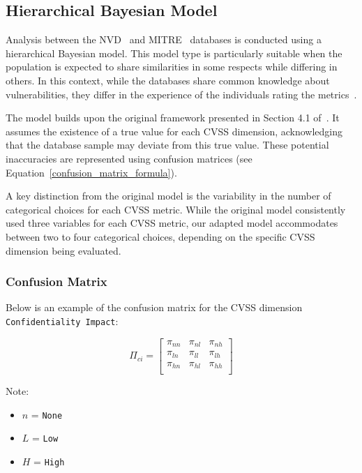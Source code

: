 \documentclass[12pt]{article}
\begin{document}
\subsection{Hierarchical Bayesian Model} \label{bayesian_modeling}

Analysis between the NVD~\cite{NVD} and MITRE~\cite{MITRE} databases is conducted using a
hierarchical Bayesian model. This model type is particularly suitable when the population is
expected to share similarities in some respects while differing in others. In this context, while
the databases share common knowledge about vulnerabilities, they differ in the experience of the
individuals rating the metrics~\cite{bayes}.

The model builds upon the original framework presented in Section 4.1 of~\cite{bayes}. It assumes
the existence of a true value for each CVSS dimension, acknowledging that the database sample may
deviate from this true value. These potential inaccuracies are represented using confusion matrices
(see Equation~\ref{confusion_matrix_formula}).

A key distinction from the original model is the variability in the number of categorical choices
for each CVSS metric. While the original model consistently used three variables for each CVSS
metric, our adapted model accommodates between two to four categorical choices, depending on the
specific CVSS dimension being evaluated.

\subsubsection{Confusion Matrix}

Below is an example of the confusion matrix for the CVSS dimension \texttt{Confidentiality Impact}:

\begin{equation}\label{confusion_matrix_formula}
	\Pi_{ci} = \begin{bmatrix}
		\pi_{nn} & \pi_{nl} & \pi_{nh} \\
		\pi_{ln} & \pi_{ll} & \pi_{lh} \\
		\pi_{hn} & \pi_{hl} & \pi_{hh} \\
	\end{bmatrix}
\end{equation}

Note:
\begin{itemize}
	\item $n$ = \texttt{None}
	\item $L$ = \texttt{Low}
	\item $H$ = \texttt{High}
\end{itemize}
\end{document}
